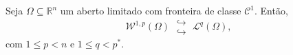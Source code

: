 \documentclass[a4paper, 11pt]{book}
\theoremstyle{definition}
\newcommand{\bN}{\mathbb{N}}
\newcommand{\bR}{\mathbb{R}}
\newcommand{\cC}{\mathcal{C}}
\newcommand{\cL}{\mathcal{L}}
\newcommand{\cW}{\mathcal{W}}
\newcommand{\doublehookrightarrow}{\;\substack{\hookrightarrow \\ \hookrightarrow}\;}
\begin{document}
\begin{tbox} \label{thm:compacidade}
    Seja $\Omega \subseteq \bR^n$ um aberto limitado com fronteira de classe $\cC^1$.
    Então,
    \[
        \cW^{1,p}(\Omega) \doublehookrightarrow \cL^q(\Omega),
    \]
    com $1 \leqslant p < n$ e $1 \leqslant q < p^*$.
\end{tbox}

\end{document}
